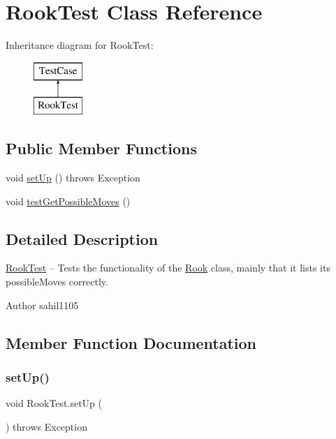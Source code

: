 \hypertarget{class_rook_test}{}\section{Rook\+Test Class Reference}
\label{class_rook_test}
Inheritance diagram for Rook\+Test\+:\begin{figure}[H]
\begin{center}
\leavevmode
\includegraphics[height=2.000000cm]{class_rook_test}
\end{center}
\end{figure}
\subsection*{Public Member Functions}
\begin{DoxyCompactItemize}
\item 
void \mbox{\hyperlink{class_rook_test_a157f1817991c8976b30db813416be69d}{set\+Up}} ()  throws Exception 
\item 
void \mbox{\hyperlink{class_rook_test_ab9a2a72da4718bb50f0b57d95862afbc}{test\+Get\+Possible\+Moves}} ()
\end{DoxyCompactItemize}


\subsection{Detailed Description}
\mbox{\hyperlink{class_rook_test}{Rook\+Test}} -- Tests the functionality of the \mbox{\hyperlink{class_rook}{Rook}} class, mainly that it lists its possible\+Moves correctly. \begin{DoxyAuthor}{Author}
sahil1105 
\end{DoxyAuthor}


\subsection{Member Function Documentation}
\mbox{\label{class_rook_test_a157f1817991c8976b30db813416be69d}} 
\subsubsection{\texorpdfstring{set\+Up()}{setUp()}}
{\footnotesize\ttfamily void Rook\+Test.\+set\+Up (\begin{DoxyParamCaption}{ }\end{DoxyParamCaption}) throws Exception}

